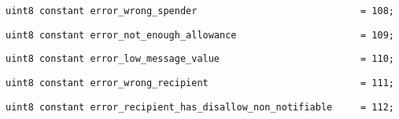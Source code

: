 \begin{lstlisting}[firstnumber=12]
    uint8 constant error_wrong_spender                             = 108;
\end{lstlisting}

\begin{lstlisting}[firstnumber=13]
    uint8 constant error_not_enough_allowance                      = 109;
\end{lstlisting}

\begin{lstlisting}[firstnumber=14]
    uint8 constant error_low_message_value                         = 110;
\end{lstlisting}

\begin{lstlisting}[firstnumber=15]
    uint8 constant error_wrong_recipient                           = 111;
\end{lstlisting}

\begin{lstlisting}[firstnumber=16]
    uint8 constant error_recipient_has_disallow_non_notifiable     = 112;
\end{lstlisting}

